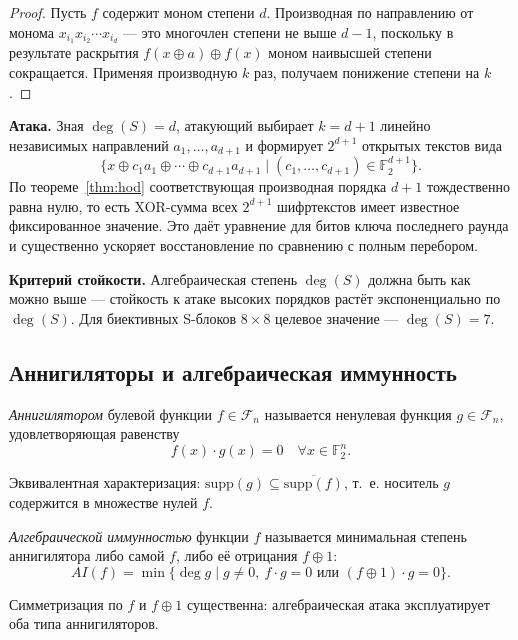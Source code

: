 \begin{proof}
Пусть $f$ содержит моном степени $d$. Производная по направлению
от монома $x_{i_1} x_{i_2} \cdots x_{i_d}$ — это многочлен степени
не выше $d - 1$, поскольку в результате раскрытия
$f(x \oplus a) \oplus f(x)$ моном наивысшей степени сокращается.
Применяя производную $k$ раз, получаем понижение степени на $k$.
\end{proof}

\textbf{Атака.} Зная $\deg(S) = d$, атакующий выбирает $k = d + 1$
линейно независимых направлений $a_1, \dots, a_{d+1}$ и формирует
$2^{d+1}$ открытых текстов вида
\[
    \{x \oplus c_1 a_1 \oplus \cdots \oplus c_{d+1} a_{d+1} \mid (c_1, \dots, c_{d+1}) \in \mathbb{F}_2^{d+1}\}.
\]
По теореме~\ref{thm:hod} соответствующая производная порядка $d + 1$
тождественно равна нулю, то есть XOR-сумма всех $2^{d+1}$ шифртекстов
имеет известное фиксированное значение. Это даёт уравнение для битов
ключа последнего раунда и существенно ускоряет восстановление по
сравнению с полным перебором.

\textbf{Критерий стойкости.} Алгебраическая степень $\deg(S)$ должна
быть как можно выше — стойкость к атаке высоких порядков растёт
экспоненциально по $\deg(S)$. Для биективных S-блоков $8 \times 8$
целевое значение — $\deg(S) = 7$.

\subsection{Аннигиляторы и алгебраическая иммунность}

\begin{definition}
\emph{Аннигилятором} булевой функции $f \in \mathcal{F}_n$ называется
ненулевая функция $g \in \mathcal{F}_n$, удовлетворяющая равенству
\[
    f(x) \cdot g(x) = 0 \quad \forall x \in \mathbb{F}_2^n.
\]
\end{definition}

Эквивалентная характеризация: $\mathrm{supp}(g) \subseteq \overline{\mathrm{supp}(f)}$,
т.~е. носитель $g$ содержится в множестве нулей $f$.

\begin{definition}
\emph{Алгебраической иммунностью} функции $f$ называется минимальная
степень аннигилятора либо самой $f$, либо её отрицания $f \oplus 1$:
\[
    AI(f) = \min \{\deg g \mid g \neq 0,\ f \cdot g = 0 \text{ или } (f \oplus 1) \cdot g = 0\}.
\]
\end{definition}

Симметризация по $f$ и $f \oplus 1$ существенна: алгебраическая атака
эксплуатирует оба типа аннигиляторов.

